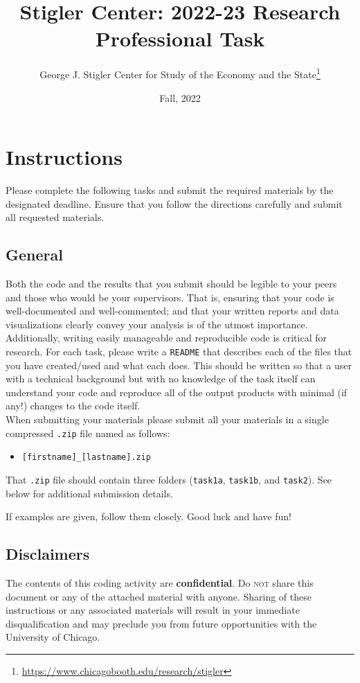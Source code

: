 \documentclass[11pt, letterpaper, twoside]{article}
\title{\textbf{Stigler Center: 2022-23 Research Professional Task}}
\date{Fall, 2022}
\author{George J. Stigler Center for Study of the Economy and the State\thanks{\href{https://www.chicagobooth.edu/research/stigler}{https://www.chicagobooth.edu/research/stigler}}}
\begin{document}
\maketitle

\section*{Instructions}
Please complete the following tasks and submit the required materials by the designated deadline. Ensure that you follow the directions carefully and submit all requested materials.

\subsection*{General}
Both the code and the results that you submit should be legible to your peers and those who would be your supervisors. That is, ensuring that your code is well-documented and well-commented; and that your written reports and data visualizations clearly convey your analysis is of the utmost importance.\\

Additionally, writing easily manageable and reproducible code is critical for research. For each task, please write a \verb|README| that describes each of the files that you have created/used and what each does. This should be written so that a user with a technical background but with no knowledge of the task itself can understand your code and reproduce all of the output products with minimal (if any!) changes to the code itself.\\

When submitting your materials please submit all your materials in a single compressed \verb|.zip| file named as follows:
\begin{itemize}
    \item \verb|[firstname]_[lastname].zip|
\end{itemize}
That \verb|.zip| file should contain three folders (\verb|task1a|, \verb|task1b|, and \verb|task2|). See below for additional submission details.

If examples are given, follow them closely. Good luck and have fun!

\subsection*{Disclaimers}
The contents of this coding activity are \textbf{confidential}. Do \textsc{not} share this document or any of the attached material with anyone. Sharing of these instructions or any associated materials will result in your immediate disqualification and may preclude you from future opportunities with the University of Chicago.
\end{document}
